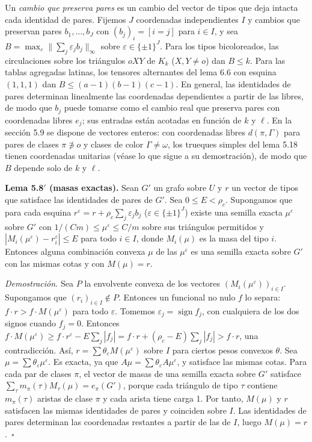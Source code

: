 \documentclass[spanish,11pt,a4paper]{article}
\begin{document}
Un \emph{cambio que preserva pares} es un cambio del vector de tipos que deja intacta cada identidad de pares. Fijemos \(J\) coordenadas independientes \(I\) y cambios que preservan pares \(b_1,\dots,b_J\) con \((b_j)_i=[i=j]\) para \(i\in I\), y sea \(B=\max_\varepsilon\|\sum_j\varepsilon_jb_j\|_\infty\) sobre \(\varepsilon\in\{\pm1\}^J\). Para los tipos bicoloreados, las circulaciones sobre los triángulos \(oXY\) de \(K_k\) (\(X,Y\ne o\)) dan \(B\le k\). Para las tablas agregadas latinas, los tensores alternantes del lema 6.6 con esquina \((1,1,1)\) dan \(B\le(a-1)(b-1)(c-1)\). En general, las identidades de pares determinan linealmente las coordenadas dependientes a partir de las libres, de modo que \(b_j\) puede tomarse como el cambio real que preserva pares con coordenadas libres \(e_j\); sus entradas están acotadas en función de \(k\) y \(\ell\). En la sección 5.9 se dispone de vectores enteros: con coordenadas libres \(d(\pi,\Gamma)\) para pares de clases \(\pi\not\ni o\) y clases de color \(\Gamma\ne\omega\), los trueques simples del lema 5.18 tienen coordenadas unitarias (véase lo que sigue a su demostración), de modo que \(B\) depende solo de \(k\) y \(\ell\).

\textbf{Lema 5.8\('\) (masas exactas).} Sean \(G'\) un grafo sobre \(U\) y \(r\) un vector de tipos que satisface las identidades de pares de \(G'\). Sea \(0\le E<\rho_c\). Supongamos que para cada esquina \(r^\varepsilon=r+\rho_c\sum_j\varepsilon_jb_j\) (\(\varepsilon\in\{\pm1\}^J\)) existe una semilla exacta \(\mu^\varepsilon\) sobre \(G'\) con \(1/(Cm)\le\mu^\varepsilon\le C/m\) sobre sus triángulos permitidos y \(|M_i(\mu^\varepsilon)-r^\varepsilon_i|\le E\) para todo \(i\in I\), donde \(M_i(\mu)\) es la masa del tipo \(i\). Entonces alguna combinación convexa \(\mu\) de las \(\mu^\varepsilon\) es una semilla exacta sobre \(G'\) con las mismas cotas y con \(M(\mu)=r\).

\emph{Demostración.} Sea \(P\) la envolvente convexa de los vectores \((M_i(\mu^\varepsilon))_{i\in I}\). Supongamos que \((r_i)_{i\in I}\notin P\). Entonces un funcional no nulo \(f\) lo separa: \(f\cdot r>f\cdot M(\mu^\varepsilon)\) para todo \(\varepsilon\). Tomemos \(\varepsilon_j=\operatorname{sign}f_j\), con cualquiera de los dos signos cuando \(f_j=0\). Entonces \(f\cdot M(\mu^\varepsilon)\ge f\cdot r^\varepsilon-E\sum_j|f_j|=f\cdot r+(\rho_c-E)\sum_j|f_j|>f\cdot r\), una contradicción. Así, \(r=\sum\theta_\varepsilon M(\mu^\varepsilon)\) sobre \(I\) para ciertos pesos convexos \(\theta\). Sea \(\mu=\sum\theta_\varepsilon\mu^\varepsilon\). Es exacta, ya que \(A\mu=\sum\theta_\varepsilon A\mu^\varepsilon\), y satisface las mismas cotas. Para cada par de clases \(\pi\), el vector de masas de una semilla exacta sobre \(G'\) satisface \(\sum_\tau m_\pi(\tau)M_\tau(\mu)=e_\pi(G')\), porque cada triángulo de tipo \(\tau\) contiene \(m_\pi(\tau)\) aristas de clase \(\pi\) y cada arista tiene carga 1. Por tanto, \(M(\mu)\) y \(r\) satisfacen las mismas identidades de pares y coinciden sobre \(I\). Las identidades de pares determinan las coordenadas restantes a partir de las de \(I\), luego \(M(\mu)=r\).~\(\square\)
\end{document}
